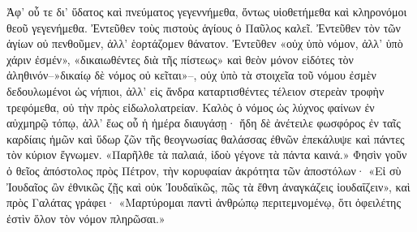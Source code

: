 \documentclass[10pt]{book}
\newcommand{\switchEnglish}{\selectlanguage{english} \switchcolumn}
\begin{document}
\begin{paracol}{2}
Ἀφ’ οὗ τε δι’ ὕδατος καὶ πνεύματος γεγεννήμεθα, ὄντως υἱοθετήμεθα καὶ κληρονόμοι θεοῦ γεγενήμεθα.
Ἐντεῦθεν τοὺς πιστοὺς ἁγίους ὁ Παῦλος καλεῖ.
Ἐντεῦθεν τὸν τῶν ἁγίων οὐ πενθοῦμεν, ἀλλ’ ἑορτάζομεν θάνατον.
Ἐντεῦθεν «οὐχ ὑπὸ νόμον, ἀλλ’ ὑπὸ χάριν ἐσμέν», «δικαιωθέντες διὰ τῆς πίστεως» καὶ θεὸν μόνον εἰδότες τὸν ἀληθινόν–»δικαίῳ δὲ νόμος οὐ κεῖται»–, οὐχ ὑπὸ τὰ στοιχεῖα τοῦ νόμου ἐσμὲν δεδουλωμένοι ὡς νήπιοι, ἀλλ’ εἰς ἄνδρα καταρτισθέντες τέλειον στερεὰν τροφὴν τρεφόμεθα, οὐ τὴν πρὸς εἰδωλολατρείαν.
Καλὸς ὁ νόμος ὡς λύχνος φαίνων ἐν αὐχμηρῷ τόπῳ, ἀλλ’ ἕως οὗ ἡ ἡμέρα διαυγάσῃ· ἤδη δὲ ἀνέτειλε φωσφόρος ἐν ταῖς καρδίαις ἡμῶν καὶ ὕδωρ ζῶν τῆς θεογνωσίας θαλάσσας ἐθνῶν ἐπεκάλυψε καὶ πάντες τὸν κύριον ἔγνωμεν.
«Παρῆλθε τὰ παλαιά, ἰδοὺ γέγονε τὰ πάντα καινά.» Φησὶν γοῦν ὁ θεῖος ἀπόστολος πρὸς Πέτρον, τὴν κορυφαίαν ἀκρότητα τῶν ἀποστόλων· «Εἰ σὺ Ἰουδαῖος ὢν ἐθνικῶς ζῇς καὶ οὐκ Ἰουδαϊκῶς, πῶς τὰ ἔθνη ἀναγκάζεις ἰουδαΐζειν», καὶ πρὸς Γαλάτας γράφει· «Μαρτύρομαι παντὶ ἀνθρώπῳ περιτεμνομένῳ, ὅτι ὀφειλέτης ἐστὶν ὅλον τὸν νόμον πληρῶσαι.»

\switchEnglish


\end{paracol}
\end{document}
